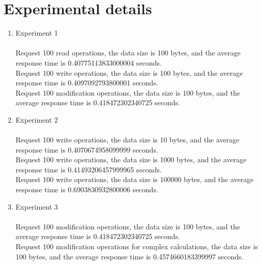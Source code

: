 \documentclass{article}
\begin{document}
\section{Experimental details}\label{sec:experimental-details}
\begin{enumerate}[label=(\alph*)]
  \item {
    Experiment 1\\\\
    Request 100 read operations, the data size is 100 bytes, and the average response time is 0.40775113833000004 seconds.\\
    Request 100 write operations, the data size is 100 bytes, and the average response time is 0.4097092793800001 seconds.\\
    Request 100 modification operations, the data size is 100 bytes, and the average response time is 0.418472302340725 seconds.\\
  }
  \item {
    Experiment 2\\\\
    Request 100 write operations, the data size is 10 bytes, and the average response time is 0.4070674958099999 seconds.\\
    Request 100 write operations, the data size is 1000 bytes, and the average response time is 0.41493206457999965 seconds.\\
    Request 100 write operations, the data size is 100000 bytes, and the average response time is 0.6903830932800006 seconds.\\
  }
  \item {
    Experiment 3\\\\
    Request 100 modification operations, the data size is 100 bytes, and the average response time is 0.418472302340725 seconds.\\
    Request 100 modification operations for complex calculations, the data size is 100 bytes, and the average response time is 0.4574660183399997 seconds.\\
  }
\end{enumerate}
\end{document}
